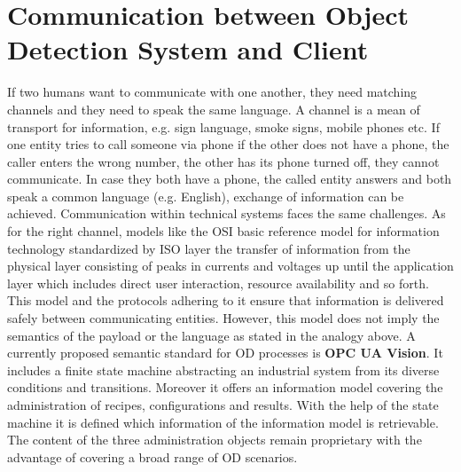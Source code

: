 \section{Communication between Object Detection System and Client}
If two humans want to communicate with one another, they need matching channels and they need to speak the same language. A channel is a mean of transport for information, e.g. sign language, smoke signs, mobile phones etc. If one entity tries to call someone via phone if the other does not have a phone, the caller enters the wrong number, the other has its phone turned off, they cannot communicate. In case they both have a phone, the called entity answers and both speak a common language (e.g. English), exchange of information can be achieved. Communication within technical systems faces the same challenges. As for the right channel, models like the OSI basic reference model for information technology standardized by ISO layer the transfer of information from the physical layer consisting of peaks in currents and voltages up until the application layer which includes direct user interaction, resource availability and so forth. \cite{InternationalOrganizationForStandardization1996ISO/IECEd.} This model and the protocols adhering to it ensure that information is delivered safely between communicating entities. However, this model does not imply the semantics of the payload or the language as stated in the analogy above. A currently proposed semantic standard for OD processes is \textbf{OPC UA Vision}. It includes a finite state machine abstracting an industrial system from its diverse conditions and transitions. Moreover it offers an information model covering the administration of recipes, configurations and results. With the help of the state machine it is defined which information of the information model is retrievable. The content of the three administration objects remain proprietary with the advantage of covering a broad range of OD scenarios.\\

